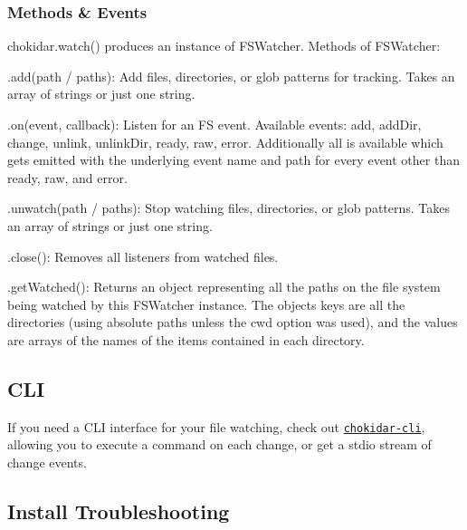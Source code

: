 \subsubsection*{Methods \& Events}

{\ttfamily chokidar.\+watch()} produces an instance of {\ttfamily F\+S\+Watcher}. Methods of {\ttfamily F\+S\+Watcher}\+:


\begin{DoxyItemize}
\item {\ttfamily .add(path / paths)}\+: Add files, directories, or glob patterns for tracking. Takes an array of strings or just one string.
\item {\ttfamily .on(event, callback)}\+: Listen for an FS event. Available events\+: {\ttfamily add}, {\ttfamily add\+Dir}, {\ttfamily change}, {\ttfamily unlink}, {\ttfamily unlink\+Dir}, {\ttfamily ready}, {\ttfamily raw}, {\ttfamily error}. Additionally {\ttfamily all} is available which gets emitted with the underlying event name and path for every event other than {\ttfamily ready}, {\ttfamily raw}, and {\ttfamily error}.
\item {\ttfamily .unwatch(path / paths)}\+: Stop watching files, directories, or glob patterns. Takes an array of strings or just one string.
\item {\ttfamily .close()}\+: Removes all listeners from watched files.
\item {\ttfamily .get\+Watched()}\+: Returns an object representing all the paths on the file system being watched by this {\ttfamily F\+S\+Watcher} instance. The object\textquotesingle{}s keys are all the directories (using absolute paths unless the {\ttfamily cwd} option was used), and the values are arrays of the names of the items contained in each directory.
\end{DoxyItemize}

\subsection*{C\+LI}

If you need a C\+LI interface for your file watching, check out \href{https://github.com/kimmobrunfeldt/chokidar-cli}{\tt chokidar-\/cli}, allowing you to execute a command on each change, or get a stdio stream of change events.

\subsection*{Install Troubleshooting}



